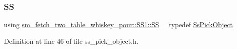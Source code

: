 \subsubsection{\texorpdfstring{SS}{SS}}
{\footnotesize\ttfamily using \hyperlink{namespacesm__fetch__two__table__whiskey__pour_1_1SS1_ace01409135917e2e5d04ee7702496158}{sm\+\_\+fetch\+\_\+two\+\_\+table\+\_\+whiskey\+\_\+pour\+::\+S\+S1\+::\+SS} = typedef \hyperlink{structsm__fetch__two__table__whiskey__pour_1_1SS1_1_1SsPickObject}{Ss\+Pick\+Object}}



Definition at line 46 of file ss\+\_\+pick\+\_\+object.\+h.

